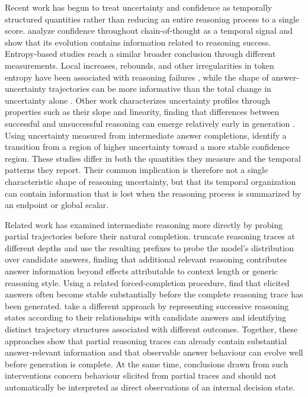 \documentclass{article}
\begin{document}
Recent work has begun to treat uncertainty and confidence as temporally structured quantities rather than reducing an entire reasoning process to a single score. \citet{mao2025temporalizing} analyze confidence throughout chain-of-thought as a temporal signal and show that its evolution contains information related to reasoning success. Entropy-based studies reach a similar broader conclusion through different measurements. Local increases, rebounds, and other irregularities in token entropy have been associated with reasoning failures \citep{zhu2026edis}, while the shape of answer-uncertainty trajectories can be more informative than the total change in uncertainty alone \citep{zhao2026entropytrajectory}. Other work characterizes uncertainty profiles through properties such as their slope and linearity, finding that differences between successful and unsuccessful reasoning can emerge relatively early in generation \citep{grunefeld2026tracing}. Using uncertainty measured from intermediate answer completions, \citet{xu2026entropy} identify a transition from a region of higher uncertainty toward a more stable confidence region. These studies differ in both the quantities they measure and the temporal patterns they report. Their common implication is therefore not a single characteristic shape of reasoning uncertainty, but that its temporal organization can contain information that is lost when the reasoning process is summarized by an endpoint or global scalar.

Related work has examined intermediate reasoning more directly by probing partial trajectories before their natural completion. \citet{ballon2026probing} truncate reasoning traces at different depths and use the resulting prefixes to probe the model's distribution over candidate answers, finding that additional relevant reasoning contributes answer information beyond effects attributable to context length or generic reasoning style. Using a related forced-completion procedure, \citet{datta2026decide} find that elicited answers often become stable substantially before the complete reasoning trace has been generated. \citet{zhou2025landscape} take a different approach by representing successive reasoning states according to their relationships with candidate answers and identifying distinct trajectory structures associated with different outcomes. Together, these approaches show that partial reasoning traces can already contain substantial answer-relevant information and that observable answer behaviour can evolve well before generation is complete. At the same time, conclusions drawn from such interventions concern behaviour elicited from partial traces and should not automatically be interpreted as direct observations of an internal decision state.
\end{document}
